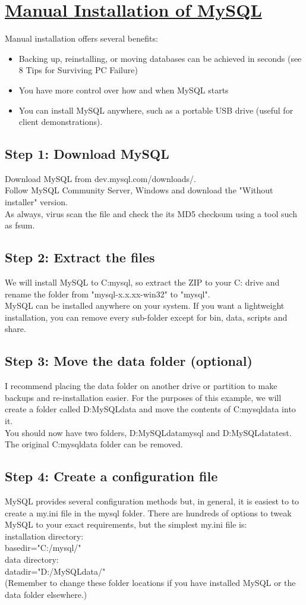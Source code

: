 
\section*{\underline{\textbf{Manual Installation of MySQL}}}
  Manual installation offers several benefits: 
\begin{itemize}
\item Backing up, reinstalling, or moving databases can be achieved in seconds (see 8 Tips for Surviving PC Failure) 
\item You have more control over how and when MySQL starts 
\item You can install MySQL anywhere, such as a portable USB drive (useful for client demonstrations). 
\end{itemize}
\subsection*{Step 1: Download MySQL}
Download MySQL from dev.mysql.com/downloads/. \\
Follow MySQL Community Server, Windows and download the "Without installer" version.\\
As always, virus scan the file and check the its MD5 checksum using a tool such as fsum.
\subsection*{Step 2: Extract the files}
We will install MySQL to C:mysql, so extract the ZIP to your C: drive and rename the folder from "mysql-x.x.xx-win32" to "mysql".\\
MySQL can be installed anywhere on your system. If you want a lightweight installation, you can remove every sub-folder except for bin, data, scripts and share.
\subsection*{Step 3: Move the data folder (optional)}
I recommend placing the data folder on another drive or partition to make backups and re-installation easier. For the purposes of this example, we will create a folder called D:MySQLdata and move the contents of C:mysqldata into it. \\
You should now have two folders, D:MySQLdatamysql and D:MySQLdatatest. The original C:mysqldata folder can be removed.
\subsection*{Step 4: Create a configuration file}
MySQL provides several configuration methods but, in general, it is easiest to to create a my.ini file in the mysql folder. There are hundreds of options to tweak MySQL to your exact requirements, but the simplest my.ini file is:\\
installation directory:\\
basedir="C:/mysql/"\\
data directory:\\
datadir="D:/MySQLdata/"\\
(Remember to change these folder locations if you have installed MySQL or the data folder elsewhere.)
